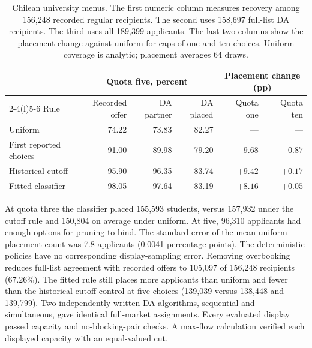 \begin{table}[ht]\centering\small
\caption{Chilean university menus. The first numeric column measures recovery among 156,248 recorded regular recipients. The second uses 158,697 full-list DA recipients. The third uses all 189,399 applicants. The last two columns show the placement change against uniform for caps of one and ten choices. Uniform coverage is analytic; placement averages 64 draws.}
\label{tab:paes}\begin{tabular}{@{}lrrrrr@{}}\toprule
 &\multicolumn{3}{c}{Quota five, percent}&\multicolumn{2}{c}{Placement change (pp)}\\
\cmidrule(lr){2-4}\cmidrule(l){5-6}
Rule & Recorded offer & DA partner & DA placed & Quota one & Quota ten\\\midrule
Uniform & 74.22 & 73.83 & 82.27 & --- & ---\\
First reported choices & 91.00 & 89.98 & 79.20 & $-9.68$ & $-0.87$\\
Historical cutoff & 95.90 & 96.35 & 83.74 & $+9.42$ & $+0.17$\\
Fitted classifier & 98.05 & 97.64 & 83.19 & $+8.16$ & $+0.05$\\\bottomrule
\end{tabular}\end{table}

At quota three the classifier placed 155,593 students, versus 157,932 under the cutoff rule and 150,804 on average under uniform. At five, 96,310 applicants had enough options for pruning to bind. The standard error of the mean uniform placement count was 7.8 applicants (0.0041 percentage points). The deterministic policies have no corresponding display-sampling error. Removing overbooking reduces full-list agreement with recorded offers to 105,097 of 156,248 recipients (67.26\%). The fitted rule still places more applicants than uniform and fewer than the historical-cutoff control at five choices (139,039 versus 138,448 and 139,799). Two independently written DA algorithms, sequential and simultaneous, gave identical full-market assignments. Every evaluated display passed capacity and no-blocking-pair checks. A max-flow calculation verified each displayed capacity with an equal-valued cut.


